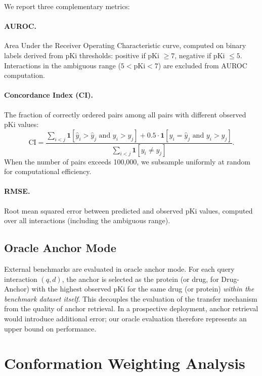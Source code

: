 \documentclass[11pt]{article}
\begin{document}
We report three complementary metrics:

\paragraph{AUROC.}
Area Under the Receiver Operating Characteristic curve, computed on binary labels derived from pKi thresholds: positive if pKi $\geq 7$, negative if pKi $\leq 5$. Interactions in the ambiguous range ($5 < \mathrm{pKi} < 7$) are excluded from AUROC computation.

\paragraph{Concordance Index (CI).}
The fraction of correctly ordered pairs among all pairs with different observed pKi values:
\[
\mathrm{CI} = \frac{\sum_{i<j} \mathbf{1}[\hat{y}_i > \hat{y}_j \text{ and } y_i > y_j] + 0.5 \cdot \mathbf{1}[\hat{y}_i = \hat{y}_j \text{ and } y_i > y_j]}{\sum_{i<j} \mathbf{1}[y_i \neq y_j]}.
\]
When the number of pairs exceeds 100,000, we subsample uniformly at random for computational efficiency.

\paragraph{RMSE.}
Root mean squared error between predicted and observed pKi values, computed over all interactions (including the ambiguous range).

\subsection{Oracle Anchor Mode}

External benchmarks are evaluated in oracle anchor mode. For each query interaction $(q, d)$, the anchor is selected as the protein (or drug, for Drug-Anchor) with the highest observed pKi for the same drug (or protein) \emph{within the benchmark dataset itself}. This decouples the evaluation of the transfer mechanism from the quality of anchor retrieval. In a prospective deployment, anchor retrieval would introduce additional error; our oracle evaluation therefore represents an upper bound on performance.

\section{Conformation Weighting Analysis}
\label{sec:conformation}
\end{document}
